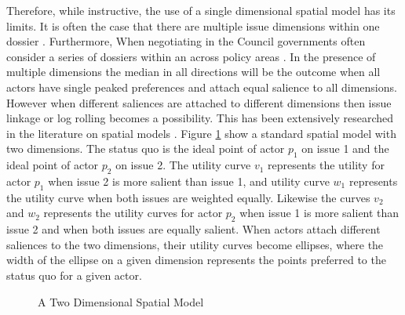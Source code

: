 Therefore, while instructive, the use of a single dimensional spatial model has its limits. It is often the case that there are multiple issue dimensions within one dossier \citep{Thomson2006a}. Furthermore, When negotiating in the Council governments often consider a series of dossiers within an across policy areas \citep{MattilaLane2001,KonigJunge2009}. In the presence of multiple dimensions the median in all directions will be the outcome when all actors have single peaked preferences and attach equal salience to all dimensions. However when different saliences are attached to different dimensions then issue linkage or log rolling becomes a possibility. This has been extensively researched in the literature on spatial models \citetext{for a good overview of contributions see \citealt{HinichMunger1997,Poole2005}}. Figure \ref{fig:twodimensions} show a standard spatial model with two dimensions. The status quo is the ideal point of actor $p_1$ on issue 1 and the ideal point of actor $p_2$ on issue 2. The utility curve $v_1$ represents the utility for actor $p_1$ when issue 2 is more salient than issue 1, and utility curve $w_1$ represents the utility curve when both issues are weighted equally. Likewise the curves $v_2$ and $w_2$ represents the utility curves for actor $p_2$ when issue 1 is more salient than issue 2 and when both issues are equally salient. When actors attach different saliences to the two dimensions, their utility curves become ellipses, where the width of the ellipse on a given dimension represents the points preferred to the status quo for a given actor.  

\begin{figure}[htpb]
  \centering
  \caption{A Two Dimensional Spatial Model}
  \label{fig:twodimensions}
\end{figure}

